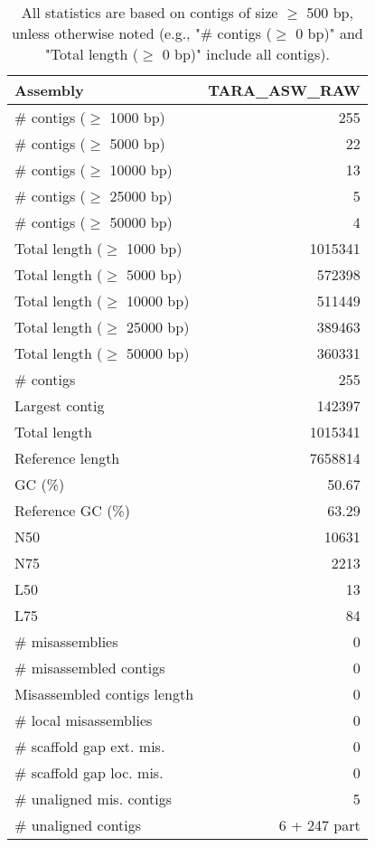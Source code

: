 \documentclass[12pt,a4paper]{article}
\begin{document}
\begin{table}[ht]
\begin{center}
\caption{All statistics are based on contigs of size $\geq$ 500 bp, unless otherwise noted (e.g., "\# contigs ($\geq$ 0 bp)" and "Total length ($\geq$ 0 bp)" include all contigs).}
\begin{tabular}{|l*{1}{|r}|}
\hline
Assembly & TARA\_ASW\_RAW \\ \hline
\# contigs ($\geq$ 1000 bp) & 255 \\ \hline
\# contigs ($\geq$ 5000 bp) & 22 \\ \hline
\# contigs ($\geq$ 10000 bp) & 13 \\ \hline
\# contigs ($\geq$ 25000 bp) & 5 \\ \hline
\# contigs ($\geq$ 50000 bp) & 4 \\ \hline
Total length ($\geq$ 1000 bp) & 1015341 \\ \hline
Total length ($\geq$ 5000 bp) & 572398 \\ \hline
Total length ($\geq$ 10000 bp) & 511449 \\ \hline
Total length ($\geq$ 25000 bp) & 389463 \\ \hline
Total length ($\geq$ 50000 bp) & 360331 \\ \hline
\# contigs & 255 \\ \hline
Largest contig & 142397 \\ \hline
Total length & 1015341 \\ \hline
Reference length & 7658814 \\ \hline
GC (\%) & 50.67 \\ \hline
Reference GC (\%) & 63.29 \\ \hline
N50 & 10631 \\ \hline
N75 & 2213 \\ \hline
L50 & 13 \\ \hline
L75 & 84 \\ \hline
\# misassemblies & 0 \\ \hline
\# misassembled contigs & 0 \\ \hline
Misassembled contigs length & 0 \\ \hline
\# local misassemblies & 0 \\ \hline
\# scaffold gap ext. mis. & 0 \\ \hline
\# scaffold gap loc. mis. & 0 \\ \hline
\# unaligned mis. contigs & 5 \\ \hline
\# unaligned contigs & 6 + 247 part \\ \hline

\end{tabular}
\end{center}
\end{table}
\end{document}
